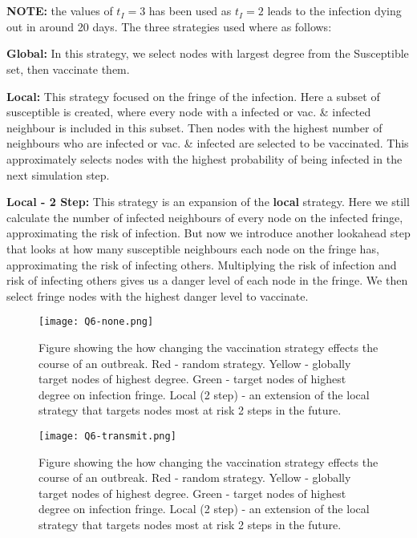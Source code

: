 \section{}
\textbf{NOTE: } the values of $t_I=3$ has been used as $t_I=2$ leads to the infection dying out in around 20 days.
The three strategies used where as follows:

\textbf{Global:} In this strategy, we select nodes with largest degree from the Susceptible set, then vaccinate them.

\textbf{Local:} This strategy focused on the fringe of the infection.
Here a subset of susceptible is created, where every node with a infected or vac. \& infected neighbour is included in this subset.
Then nodes with the highest number of neighbours who are infected or vac. \& infected are selected to be vaccinated.
This approximately selects nodes with the highest probability of being infected in the next simulation step.

\textbf{Local - 2 Step:} This strategy is an expansion of the \textbf{local} strategy. 
Here we still calculate the number of infected neighbours of every node on the infected fringe, approximating the risk of infection.
But now we introduce another lookahead step that looks at how many susceptible neighbours each node on the fringe has, approximating the risk of infecting others.
Multiplying the risk of infection and risk of infecting others gives us a danger level of each node in the fringe.
We then select fringe nodes with the highest danger level to vaccinate.  

\begin{figure}[h!]
    \begin{center}
        \texttt{[image: Q6-none.png]}
        \caption{Figure showing the how changing the vaccination strategy effects the course of an outbreak. Red - random strategy. Yellow - globally target nodes of highest degree. Green - target nodes of highest degree on infection fringe. Local (2 step) - an extension of the local strategy that targets nodes most at risk 2 steps in the future.} 
        \label{fig:q6-none}
    \end{center}
\end{figure}


\begin{figure}[h!]
    \begin{center}
        \texttt{[image: Q6-transmit.png]}
        \caption{Figure showing the how changing the vaccination strategy effects the course of an outbreak. Red - random strategy. Yellow - globally target nodes of highest degree. Green - target nodes of highest degree on infection fringe. Local (2 step) - an extension of the local strategy that targets nodes most at risk 2 steps in the future.} 
        \label{fig:q6-transmit}
    \end{center}
\end{figure}


